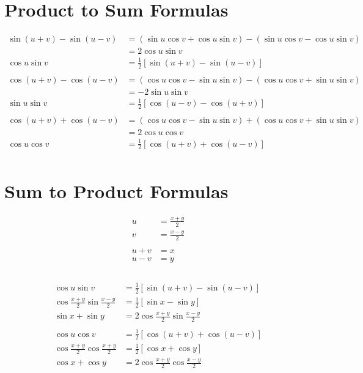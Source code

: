 \documentclass{exam}
\begin{document}
  \section{Product to Sum Formulas}
  \begin{align*}
    \sin(u + v) - \sin(u - v) & = (\sin u \cos v + \cos u \sin v) - (\sin u \cos v - \cos u \sin v) \\
                              & = 2 \cos u \sin v \\
    \cos u \sin v             & = \frac{1}{2} [ \sin(u + v) - \sin(u - v) ] \\
    \\
    \cos(u + v) - \cos(u - v) & = (\cos u \cos v - \sin u \sin v) - (\cos u \cos v + \sin u \sin v) \\
                              & = - 2 \sin u \sin v \\
    \sin u \sin v             & = \frac{1}{2} [ \cos(u - v) - \cos(u + v) ] \\
    \\
    \cos(u + v) + \cos(u - v) & = (\cos u \cos v - \sin u \sin v) + (\cos u \cos v + \sin u \sin v) \\
                              & = 2 \cos u \cos v \\
    \cos u \cos v             & = \frac{1}{2} [ \cos(u + v) + \cos(u - v) ] \\
   \end{align*}

  \section{Sum to Product Formulas}
  \begin{align*}
    u &= \frac{x + y}{2} \\
    v &= \frac{x - y}{2} \\
    \\
    u + v &= x \\
    u - v &= y \\
    \\
  \end{align*}

  \begin{align*}
    \cos u \sin v                             & = \frac{1}{2} [ \sin(u + v) - \sin(u - v) ] \\
    \cos \frac{x + y}{2} \sin \frac{x - y}{2} & = \frac{1}{2} [ \sin x - \sin y ] \\
    \sin x + \sin y                           & = 2 \cos \frac{x + y}{2} \sin \frac{x - y}{2} \\
    \\
    \cos u \cos v                             & = \frac{1}{2} [ \cos(u + v) + \cos(u - v) ] \\
    \cos \frac{x + y}{2} \cos \frac{x + y}{2} & = \frac{1}{2} [ \cos x + \cos y ] \\
    \cos x + \cos y                           & = 2 \cos \frac{x + y}{2} \cos \frac{x - y}{2} \\
  \end{align*}
\end{document}
